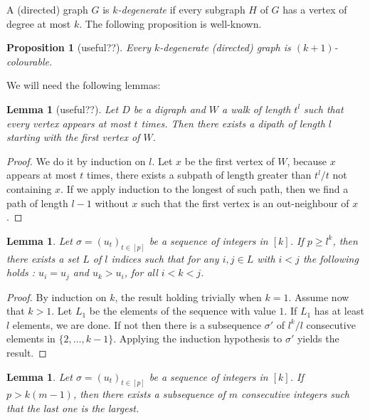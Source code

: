 \documentclass[utf8,11pt]{article}
\theoremstyle{plain}
\newtheorem{lemma}[theorem]{Lemma}
\newtheorem{proposition}[theorem]{Proposition}
\theoremstyle{definition}
\theoremstyle{remark}
\begin{document}
A (directed) graph $G$ is {\it $k$-degenerate} if every subgraph $H$ of $G$ has a vertex of degree at most $k$.
The following proposition is well-known.
\begin{proposition}[useful??]\label{prop:deg}
Every $k$-degenerate (directed) graph is $(k+1)$-colourable.
\end{proposition}





We will need the following lemmas:

\begin{lemma}[useful??]\label{walk}
Let $D$ be a digraph and $W$ a walk of length $t^l$ such that every vertex appears at most $t$ times.
Then there exists a dipath of length $l$ starting with the first vertex of $W$.
\end{lemma}

\begin{proof}
We do it by induction on $l$. Let $x$ be the first vertex of $W$, because $x$ appears at most $t$ times, there exists a subpath of length greater
than $t^l/t$ not containing $x$. If we apply induction to the longest of such path, then we find a path of length $l-1$ without $x$ such that
 the first vertex is an out-neighbour of $x$.

\end{proof}

\begin{lemma}\label{min}
Let $\sigma=(u_t)_{t\in [p]}$ be a sequence of integers in $[k]$. If $p\geq l^k$, then there exists a set $L$ of $l$ indices such that for any $i,j \in L$ with $i < j$ the following holds : $u_i=u_j$ and $u_k > u_i$, for all $i < k < j$.
\end{lemma}

\begin{proof}
By induction on $k$, the result holding trivially when $k=1$. Assume now that $k>1$. Let $L_1$ be the elements of the sequence with value $1$. If $L_1$ has at least $l$ elements, we are done.
If not then there is a subsequence $\sigma'$ of $l^k/l$ consecutive elements in $\{2, \dots , k-1\}$. Applying the induction hypothesis to $\sigma'$ yields the result.
\end{proof}

\begin{lemma}\label{max}
Let $\sigma=(u_t)_{t\in [p]}$ be a sequence of integers in $[k]$. 
If $p > k (m-1)$, then there exists a subsequence of $m$ consecutive integers such that the
last one is the largest.
\end{lemma}
\end{document}
